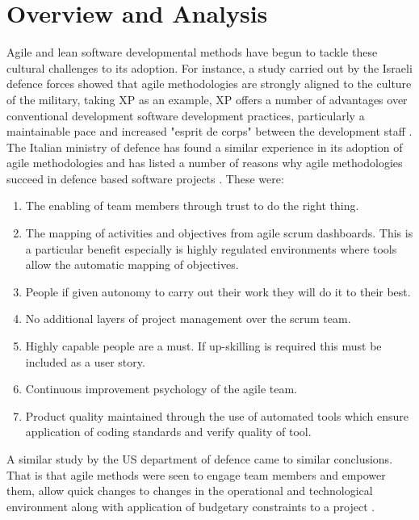 \documentclass[11pt,twocolumn]{article}
\begin{document}
\section*{\textbf{Overview and Analysis}}
Agile and lean software developmental methods have begun to tackle these cultural challenges to its adoption. For instance, a study carried out by the Israeli defence forces showed that agile methodologies are strongly aligned to the culture of the military, taking XP as an example, XP offers a number of advantages over conventional development software development practices, particularly a maintainable pace and increased "esprit de corps" between the development staff \citep{dubinsky2005agile}. The Italian ministry of defence has found a similar experience in its adoption of agile methodologies and has listed a number of reasons why agile methodologies succeed in defence based software projects \citep{chang2016agile}. These were:
\begin{enumerate}
\item The enabling of team members through trust to do the right thing.
\item The mapping of activities and objectives from agile scrum dashboards. This is a particular benefit especially is highly regulated environments where tools allow the automatic mapping of objectives.
\item People if given autonomy to carry out their work they will do it to their best.
\item No additional layers of project management over the scrum team.
\item Highly capable people are a must. If up-skilling is required this must be included as a user story.
\item Continuous improvement psychology of the agile team.
\item Product quality maintained through the use of automated tools which ensure application of coding standards and verify quality of tool.
\end{enumerate}
A similar study by the US department of defence came to similar conclusions. That is that agile methods were seen to engage team members and empower them, allow quick changes to changes in the operational and  technological environment along with application of budgetary constraints to a project \citep{lapham2011agile}.
\end{document}
